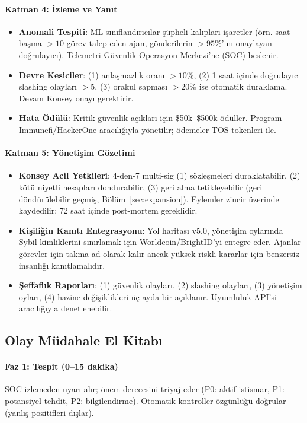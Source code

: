 \documentclass[11pt]{article}
\begin{document}
\begin{itemize}[noitemsep]
\begin{itemize}[noitemsep]
\begin{itemize}[noitemsep]
\begin{itemize}[noitemsep]
\begin{itemize}[noitemsep]
\begin{itemize}[noitemsep]
\begin{itemize}[noitemsep]
\begin{enumerate}[noitemsep]
\begin{itemize}[noitemsep]
\paragraph{Katman 4: İzleme ve Yanıt}
\begin{itemize}[noitemsep]
  \item \textbf{Anomali Tespiti}: ML sınıflandırıcılar şüpheli kalıpları işaretler (örn. saat başına $>10$ görev talep eden ajan, gönderilerin $>95\%$'ını onaylayan doğrulayıcı). Telemetri Güvenlik Operasyon Merkezi'ne (SOC) beslenir.
  \item \textbf{Devre Kesiciler}: (1) anlaşmazlık oranı $>10\%$, (2) 1 saat içinde doğrulayıcı slashing olayları $>5$, (3) orakul sapması $>20\%$ ise otomatik duraklama. Devam Konsey onayı gerektirir.
  \item \textbf{Hata Ödülü}: Kritik güvenlik açıkları için \$50k--\$500k ödüller. Program Immunefi/HackerOne aracılığıyla yönetilir; ödemeler TOS tokenleri ile.
\end{itemize}

\paragraph{Katman 5: Yönetişim Gözetimi}
\begin{itemize}[noitemsep]
  \item \textbf{Konsey Acil Yetkileri}: 4-den-7 multi-sig (1) sözleşmeleri duraklatabilir, (2) kötü niyetli hesapları dondurabilir, (3) geri alma tetikleyebilir (geri döndürülebilir geçmiş, Bölüm~\ref{sec:expansion}). Eylemler zincir üzerinde kaydedilir; 72 saat içinde post-mortem gereklidir.
  \item \textbf{Kişiliğin Kanıtı Entegrasyonu}: Yol haritası v5.0, yönetişim oylarında Sybil kimliklerini sınırlamak için Worldcoin/BrightID'yi entegre eder. Ajanlar görevler için takma ad olarak kalır ancak yüksek riskli kararlar için benzersiz insanlığı kanıtlamalıdır.
  \item \textbf{Şeffaflık Raporları}: (1) güvenlik olayları, (2) slashing olayları, (3) yönetişim oyları, (4) hazine değişiklikleri üç ayda bir açıklanır. Uyumluluk API'si aracılığıyla denetlenebilir.
\end{itemize}

\subsection{Olay Müdahale El Kitabı}

\paragraph{Faz 1: Tespit (0--15 dakika)}
SOC izlemeden uyarı alır; önem derecesini triyaj eder (P0: aktif istismar, P1: potansiyel tehdit, P2: bilgilendirme). Otomatik kontroller özgünlüğü doğrular (yanlış pozitifleri dışlar).


\end{itemize}
\end{enumerate}
\end{itemize}
\end{itemize}
\end{itemize}
\end{itemize}
\end{itemize}
\end{itemize}
\end{itemize}
\end{document}
